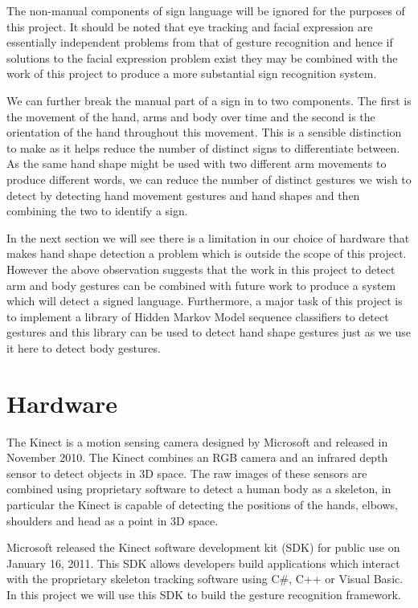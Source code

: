 The non-manual components of sign language will be ignored for the purposes of this project. It should be noted that eye tracking and facial expression are essentially independent problems from that of gesture recognition and hence if solutions to the facial expression problem exist they may be combined with the work of this project to produce a more substantial sign recognition system.

We can further break the manual part of a sign in to two components. The first is the movement of the hand, arms and body over time and the second is the orientation of the hand throughout this movement. This is a sensible distinction to make as it helps reduce the number of distinct signs to differentiate between. As the same hand shape might be used with two different arm movements to produce different words, we can reduce the number of distinct gestures we wish to detect by detecting hand movement gestures and hand shapes and then combining the two to identify a sign.

In the next section we will see there is a limitation in our choice of hardware that makes hand shape detection a problem which is outside the scope of this project. However the above observation suggests that the work in this project to detect arm and body gestures can be combined with future work to produce a system which will detect a signed language. Furthermore, a major task of this project is to implement a library of Hidden Markov Model sequence classifiers to detect gestures and this library can be used to detect hand shape gestures just as we use it here to detect body gestures. 

\section{Hardware}
The Kinect is a motion sensing camera designed by Microsoft and released in November 2010. The Kinect combines an RGB camera and an infrared depth sensor to detect objects in 3D space. The raw images of these sensors are combined using proprietary software to detect a human body as a skeleton, in particular the Kinect is capable of detecting the positions of the hands, elbows, shoulders and head as a point in 3D space.

Microsoft released the Kinect software development kit (SDK) for public use on January 16, 2011. This SDK allows developers build applications which interact with the proprietary skeleton tracking software using C\#, C++ or Visual Basic. In this project we will use this SDK to build the gesture recognition framework.


